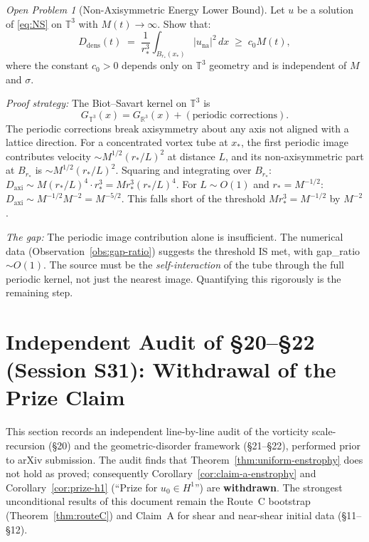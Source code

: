 \documentclass[11pt]{article}
\theoremstyle{definition}
\theoremstyle{remark}
\newtheorem{openproblem}[theorem]{Open Problem}
\begin{document}
\begin{openproblem}[Non-Axisymmetric Energy Lower Bound]\label{open:D-axi}
  Let $u$ be a solution of \eqref{eq:NS} on $\mathbb{T}^3$ with $M(t)\to\infty$.
  Show that:
  \[
    D_{\mathrm{dens}}(t) \;=\;
    \frac{1}{r_*^3}\int_{B_{r_*}(x_*)} |u_{\mathrm{na}}|^2 \,dx
    \;\ge\; c_0 M(t),
  \]
  where the constant $c_0 > 0$ depends only on $\mathbb{T}^3$ geometry and
  is independent of $M$ and $\sigma$.

  \emph{Proof strategy:} The Biot--Savart kernel on $\mathbb{T}^3$ is
  \[
    G_{\mathbb{T}^3}(x) = G_{\mathbb{R}^3}(x) + (\text{periodic corrections}).
  \]
  The periodic corrections break axisymmetry about any axis not aligned with
  a lattice direction.  For a concentrated vortex tube at $x_*$, the first
  periodic image contributes velocity $\sim M^{1/2}(r_*/L)^2$ at distance $L$,
  and its non-axisymmetric part at $B_{r_*}$ is $\sim M^{1/2}(r_*/L)^2$.
  Squaring and integrating over $B_{r_*}$:
  $D_{\mathrm{axi}} \sim M (r_*/L)^4 \cdot r_*^3 = M r_*^3 (r_*/L)^4$.
  For $L \sim O(1)$ and $r_* = M^{-1/2}$: $D_{\mathrm{axi}} \sim M^{-1/2} M^{-2} = M^{-5/2}$.
  This falls short of the threshold $M r_*^3 = M^{-1/2}$ by $M^{-2}$.

  \emph{The gap:} The periodic image contribution alone is insufficient.
  The numerical data (Observation~\ref{obs:gap-ratio}) suggests the threshold
  IS met, with gap\_ratio $\sim O(1)$.  The source must be the
  \emph{self-interaction} of the tube through the full periodic kernel,
  not just the nearest image.  Quantifying this rigorously is the remaining step.
\end{openproblem}

\section{Independent Audit of \S20--\S22 (Session S31): Withdrawal of the Prize Claim}
\label{sec:audit-s31}

This section records an independent line-by-line audit of the vorticity
scale-recursion (\S20) and the geometric-disorder framework (\S21--\S22),
performed prior to arXiv submission. The audit finds that
Theorem~\ref{thm:uniform-enstrophy} does not hold as proved; consequently
Corollary~\ref{cor:claim-a-enstrophy} and Corollary~\ref{cor:prize-h1}
(``Prize for $u_0 \in H^1$'') are \textbf{withdrawn}. The strongest
unconditional results of this document remain the Route~C bootstrap
(Theorem~\ref{thm:routeC}) and Claim~A for shear and near-shear initial data
(\S11--\S12).
\end{document}
